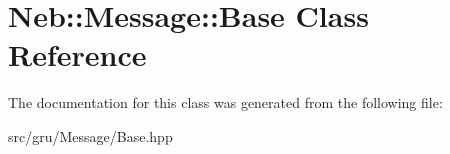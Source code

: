 \hypertarget{classNeb_1_1Message_1_1Base}{\section{\-Neb\-:\-:\-Message\-:\-:\-Base \-Class \-Reference}
\label{classNeb_1_1Message_1_1Base}
}


\-The documentation for this class was generated from the following file\-:\begin{DoxyCompactItemize}
\item 
src/gru/\-Message/\-Base.\-hpp\end{DoxyCompactItemize}
